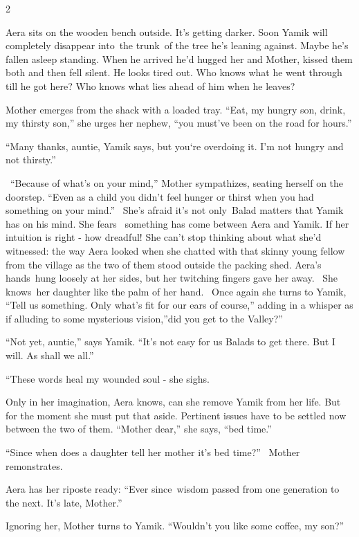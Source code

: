 \documentclass[12pt]{book}
\begin{document}
{2}

{Aera sits on the wooden bench
out}side{. }It's getting darker.
Soon{ Yamik will completely disappear into~the trunk~of the tree he's
leaning against. Maybe he's fallen asleep standing. When he }arrived he'd hugged her and Mother, kissed them both and
then fell silent. He looks tired out. Who knows what he went through till he got here? Who knows what lies ahead of him
when he leaves?

Mother emerges from the shack with a loaded tray. {{}``Eat, my hungry
son, drink, my thirsty son,'' she urges her
}{nephew}{, ``you must've been on the road for
hours.''}

{{}``Many thanks, auntie,{\textquotedbl} Yamik says, {\textquotedbl}but
you`re overdoing it. I'm not hungry }and not {thirsty.''}

\ {}``Because of what's on your mind,'' Mother sympathizes, seating herself on the doorstep. ``Even as a child you
didn't feel hunger or thirst when you had something on your mind.''~ She's afraid it's not only~Balad matters that
Yamik has on his mind. She fears \ something has come between Aera and Yamik. If her intuition is right - how dreadful!
She can't stop thinking about what she'd witnessed: the way Aera looked when she chatted with that
skinny{ }young fellow from the village as the two of them stood outside the packing shed. Aera's
hands~hung loosely at her sides, but her twitching fingers gave her away.~ She knows~her daughter like the palm of her
hand.~ Once again she turns to Yamik, ``Tell us something. Only what's fit for our ears of course,'' adding in a
whisper as if alluding to some mysterious vision,''did{ }you get to the Valley?''

{}``Not yet, auntie,'' says Yamik. ``It's not easy for us Balads to get there. But I will. As shall we all.''

{}``These words heal my wounded soul -{\textquotedbl} she sighs.

Only in her imagination, Aera knows, can she remove Yamik from her life. But for the moment she must put that aside.
Pertinent issues have to be settled now between the two of them. ``Mother dear,'' she says, ``bed time.''~

{}``Since when does a daughter tell her mother it's bed time?'' \ Mother remonstrates.

Aera has her riposte ready: ``Ever since~wisdom passed from one generation to the next. It's late, Mother.''

Ignoring her, Mother turns to Yamik. ``Wouldn't you like some coffee, my son?''
\end{document}
